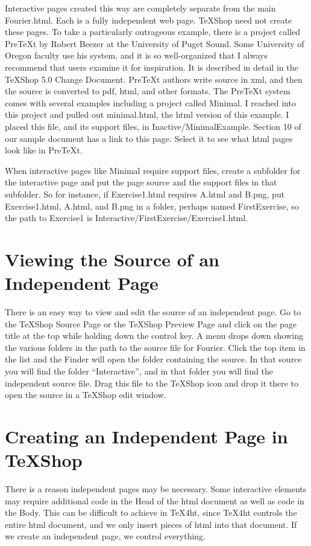 \documentclass[11pt, oneside]{article}   	%
\begin{document}
Interactive pages created this way are completely separate from the main Fourier.html. Each is a fully independent web page. TeXShop need not create these pages. To take a particularly outrageous example, there is a project called PreTeXt by Robert Beezer at the University of Puget Sound. Some University of Oregon faculty use his system, and it is so well-organized that I always recommend that users examine it for inspiration. It is described in detail in the TeXShop 5.0 Change Document. PreTeXt authors write source in xml, and then the source is converted to pdf, html, and other formats. The PreTeXt system comes with several examples including a project called Minimal. I reached into this project and pulled out minimal.html, the html version of this example.
I placed this file, and its support files, in Inactive/MinimalExample. Section 10 of our sample document has a link to this page. Select it to see what html pages look like in PreTeXt.

When interactive pages like Minimal  require support files, create a subfolder for the interactive page and put the page source and the support files in that subfolder. So for instance, if Exercise1.html requires A.html and B.png,  put Exercise1.html, A.html, and B.png in a folder, perhaps named FirstExercise, so the path to Exercise1 is
Interactive/FirstExercise/Exercise1.html.

\section{Viewing the Source of an Independent Page}

There is an easy way to view and edit the source of an independent page. Go to the TeXShop Source Page
or the TeXShop Preview Page and click on the page title at the top while holding down the control key. A menu drops down showing the various folders in the path to the source file for Fourier. Click the top item in the list and the Finder will open the folder containing the source. In that source you will find the folder ``Interactive'', and in that folder you will find the independent source file. Drag this file to the TeXShop icon and drop it there to open the source in a TeXShop edit window. 

\section{Creating an Independent Page in TeXShop}

There is a reason independent pages may be necessary. Some interactive elements may require additional code in the Head of the html document as well as code in the Body. This can be difficult to achieve in TeX4ht, since TeX4ht controls the entire html document, and we only insert pieces of html into that document. If we create an independent page, we control everything.
\end{document}
